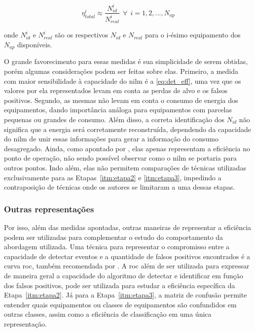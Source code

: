 \begin{equation}\label{eq:app_eff}
\eta_{total}^i\approx\frac{N_{id}^i}{N_{real}^i} ~~ \forall ~~ i =
1,2,...,N_{ap}
\end{equation}

\noindent onde $N_{id}^i$ e $N_{real}^i$ são os respectivos
$N_{id}$ e $N_{real}$ para o i-ésimo equipamento dos $N_{ap}$
disponíveis.

O grande favorecimento para essas medidas é sua simplicidade de serem
obtidas, porém algumas considerações podem ser feitas sobre elas.
Primeiro, a medida com maior sensibilidade à capacidade do \gls{nilm}
é a \ref{eq:det_eff}, uma vez que os valores por ela representados
levam em conta as perdas de alvo e os falsos positivos.
Segundo, as mesmas não levam em conta o consumo de energia dos
equipamentos, dando importância análoga para equipamentos com parcelas
pequenas ou grandes de consumo. Além disso, a correta identificação
dos $N_{id}$ não significa que a energia será corretamente
reconstruída, dependendo da capacidade do \gls{nilm} de unir essas
informações para gerar a informação do consumo desagregado.  Ainda,
como apontado por \cite{nilm_zeifman_review_2011}, elas apenas
representam a eficiência no ponto de operação, não sendo possível
observar como o \gls{nilm} se portaria para outros pontos. Indo além,
elas não permitem comparações de técnicas utilizadas exclusivamente para
as Etapas~\ref{itm:etapa2} e \ref{itm:etapa3}, impedindo a
contraposição de técnicas onde os autores se limitaram a uma dessas
etapas.

\subsubsection{Outras representações}
\label{top:outras_eff}

Por isso, além das medidas apontadas, outras maneiras de representar
a eficiência podem ser utilizadas para complementar o estudo do
comportamento da abordagem utilizada. Uma técnica para representar o
compromisso entre a capacidade de detectar eventos e a quantidade de
falsos positivos encontrados é a curva \gls{roc}, também recomendada
por \cite{nilm_zeifman_review_2011}. A \gls{roc} além de ser utilizada
para expressar de maneira geral a capacidade do algoritmo de detectar
e identificar em função dos falsos positivos, pode ser utilizada para
estudar a eficiência específica da Etapa~\ref{itm:etapa2}. Já para a
Etapa~\ref{itm:etapa3}, a matriz de confusão permite entender quais
equipamentos ou classes de equipamentos são confundidos em outras classes,
assim como a eficiência de classificação em uma única representação.

